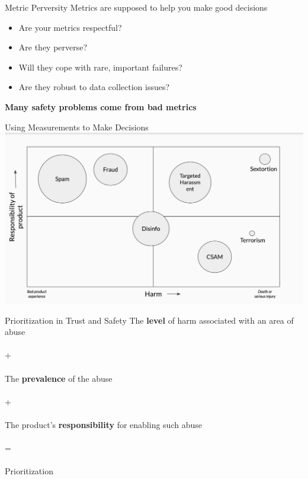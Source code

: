 \documentclass[nobackground,dvipsnames,table]{beamer}
\begin{document}
\begin{frame}{Metric Perversity}
    Metrics are supposed to help you make good decisions
    \vspace{0.05\textheight}
    \begin{itemize}
        \item Are your metrics respectful?
        \item Are they perverse?
        \item Will they cope with rare, important failures?
        \item Are they robust to data collection issues?
    \end{itemize}
    \vspace{0.1\textheight}
    \centering
    \large
    \textbf{Many safety problems come from bad metrics}
\end{frame}

\begin{frame}{Using Measurements to Make Decisions}
    \includegraphics[width=\textwidth]{responsibility-vs-harm}
\end{frame}

\begin{frame}{Prioritization in Trust and Safety}
    \centering
    The \textbf{level} of harm associated with an area of abuse\\~\\
    +\\~\\
    The \textbf{prevalence} of the abuse\\~\\
    +\\~\\
    The product’s \textbf{responsibility} for enabling such abuse\\~\\
    =\\~\\
    \large{Prioritization}
\end{frame}
\end{document}
